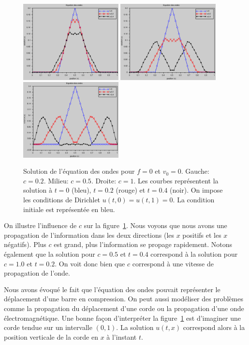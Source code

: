\documentclass[12pt,a4paper,twoside]{article}
\begin{document}
\begin{figure}[h]
  \centering
  \includegraphics[width = 5.2cm]{Figures/ondes_c0_2.eps}
  \includegraphics[width = 5.2cm]{Figures/ondes_c0_5.eps}
  \includegraphics[width = 5.2cm]{Figures/ondes_c1.eps}
  \caption{Solution de l'\'equation des ondes pour $f=0$ et $v_0 = 0$.
  Gauche: $c = 0.2$. Milieu: $c=0.5$. Droite: $c=1$.
  Les courbes repr\'esentent la solution \`a $t=0$ (bleu),
  $t=0.2$ (rouge) et $t=0.4$ (noir). On impose les conditions de Dirichlet $u(t,0) = u(t,1) = 0$.
  La condition initiale est repr\'esent\'ee en bleu.}
  \label{fig:ondes_c}
\end{figure}


On illustre l'influence de $c$ sur la figure~\ref{fig:ondes_c}.
Nous voyons que nous avons une propagation de l'information 
dans les deux directions (les $x$ positifs et les $x$ n\'egatifs).
Plus $c$ est grand, plus l'information se propage rapidement.
Notons \'egalement que la solution pour $c=0.5$ et $t=0.4$
correspond \`a la solution pour $c=1.0$ et $t=0.2$.
On voit donc bien que $c$ correspond \`a une vitesse de propagation
de l'onde.


Nous avons \'evoqu\'e le fait que l'\'equation des ondes
pouvait repr\'esenter le d\'eplacement d'une barre en compression.
On peut aussi mod\'eliser des probl\`emes 
comme la propagation du d\'eplacement d'une corde ou
la propagation d'une onde \'electromagn\'etique.
Une bonne fa\c{c}on d'interpr\'eter la figure~\ref{fig:ondes_c}
est d'imaginer une corde tendue sur un intervalle $(0,1)$.
La solution $u(t,x)$ correspond alors \`a la position verticale de la corde
en $x$ \`a l'instant $t$.
\end{document}
